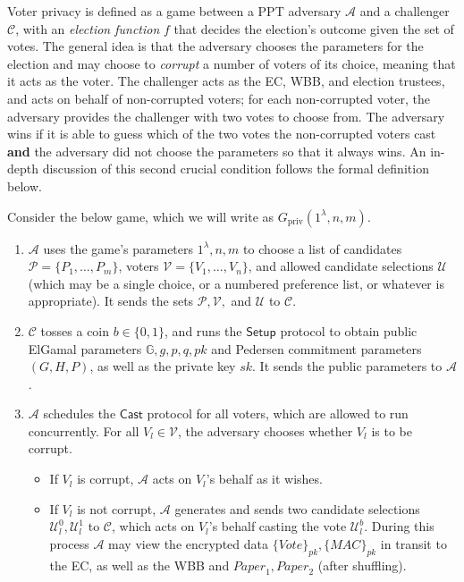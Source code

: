 \documentclass[11pt,twoside,a4paper]{article}
\theoremstyle{definition}
\newcommand{\Vote}{\mathit{Vote}}
\newcommand{\Paper}{\mathit{Paper}}
\newcommand{\Mac}{\mathit{MAC}}
\begin{document}
Voter privacy is defined as a game between a PPT adversary $\mathcal{A}$ and a challenger $\mathcal{C}$, with an \textit{election function} $f$ that decides the election's outcome given the set of votes. The general idea is that the adversary chooses the parameters for the election and may choose to \textit{corrupt} a number of voters of its choice, meaning that it acts as the voter. The challenger acts as the EC, WBB, and election trustees, and acts on behalf of non-corrupted voters; for each non-corrupted voter, the adversary provides the challenger with two votes to choose from. The adversary wins if it is able to guess which of the two votes the non-corrupted voters cast \textbf{and} the adversary did not choose the parameters so that it always wins. An in-depth discussion of this second crucial condition follows the formal definition below.
\begin{definition}
    Consider the below game, which we will write as $G_{\text{priv}}(1^\lambda, n, m)$.
    \begin{enumerate}
        \item $\mathcal{A}$ uses the game's parameters $1^\lambda, n, m$ to choose a list of candidates $\mathcal{P}=\{P_1,\ldots,P_m\}$, voters $\mathcal{V}=\{V_1,\ldots,V_n\}$, and allowed candidate selections $\mathcal{U}$ (which may be a single choice, or a numbered preference list, or whatever is appropriate). It sends the sets $\mathcal{P}, \mathcal{V},$ and $\mathcal{U}$ to $\mathcal{C}$.
        \item $\mathcal{C}$ tosses a coin $b\in\{0, 1\}$, and runs the $\mathsf{Setup}$ protocol to obtain public ElGamal parameters $\mathbb{G}, g, p, q, \mathit{pk}$ and Pedersen commitment parameters $(G, H, P)$, as well as the private key $\mathit{sk}$. It sends the public parameters to $\mathcal{A}$.
        \item $\mathcal{A}$ schedules the $\mathsf{Cast}$ protocol for all voters, which are allowed to run concurrently. For all $V_l\in\mathcal{V}$, the adversary chooses whether $V_l$ is to be corrupt.
        \begin{itemize}
            \item If $V_l$ is corrupt, $\mathcal{A}$ acts on $V_l$'s behalf as it wishes.
            \item If $V_l$ is not corrupt, $\mathcal{A}$ generates and sends two candidate selections $\mathcal{U}_l^0, \mathcal{U}_l^1$ to $\mathcal{C}$, which acts on $V_l$'s behalf casting the vote $\mathcal{U}_l^b$. During this process $\mathcal{A}$ may view the encrypted data $\{\Vote\}_{\mathit{pk}}, \{\Mac\}_{\mathit{pk}}$ in transit to the EC, as well as the WBB and $\Paper_1, \Paper_2$ (after shuffling).

\end{itemize}
\end{enumerate}
\end{definition}
\end{document}
